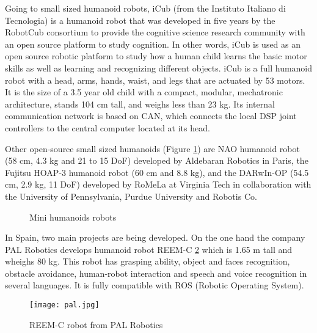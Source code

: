 Going to small sized humanoid robots, iCub (from the Instituto Italiano di Tecnologia) is a humanoid robot that was developed in five years by the RobotCub \cite{icubWeb} consortium to provide the cognitive science research community with an open source platform to study cognition. In other words, iCub is used as an open source robotic platform to study how a human child learns the basic motor skills as well as learning and recognizing different objects. iCub is a full humanoid robot with a head, arms, hands, waist, and legs that are actuated by 53 motors. It is the size of a 3.5 year old child with a compact, modular, mechatronic architecture, stands 104 cm tall, and weighs less than 23 kg. Its internal communication network is based on CAN, which connects the local DSP joint controllers to the central computer located at its head.

Other open-source small sized humanoids (Figure \ref{fig:mini}) are NAO humanoid robot (58 cm, 4.3 kg and 21 to 15 DoF) developed by Aldebaran Robotics in Paris, the Fujitsu  HOAP-3 humanoid robot (60 cm and 8.8 kg), and the DARwIn-OP (54.5 cm, 2.9 kg, 11 DoF) developed by RoMeLa at Virginia Tech in collaboration with the University of Pennsylvania, Purdue University and Robotis Co.

\begin{figure}[!hbt]
\centering 
{}
\hspace{5mm}
\hspace{5mm}
\hspace{5mm}
\label{fig:mini}
\caption{Mini humanoids robots}
\end{figure}

In Spain, two main projects are being developed. On the one hand the company PAL Robotics develops humanoid robot REEM-C \ref{fig:pal} which is 1.65 m tall  and wheighs 80 kg. This robot has grasping ability, object and faces recognition, obstacle avoidance, human-robot interaction and speech and voice recognition in several languages. It is fully compatible with ROS (Robotic Operating System).

\begin{figure}[!hbt]
\centering
\texttt{[image: pal.jpg]}
\caption{REEM-C robot from PAL Robotics}
\label{fig:pal}
\end{figure}

